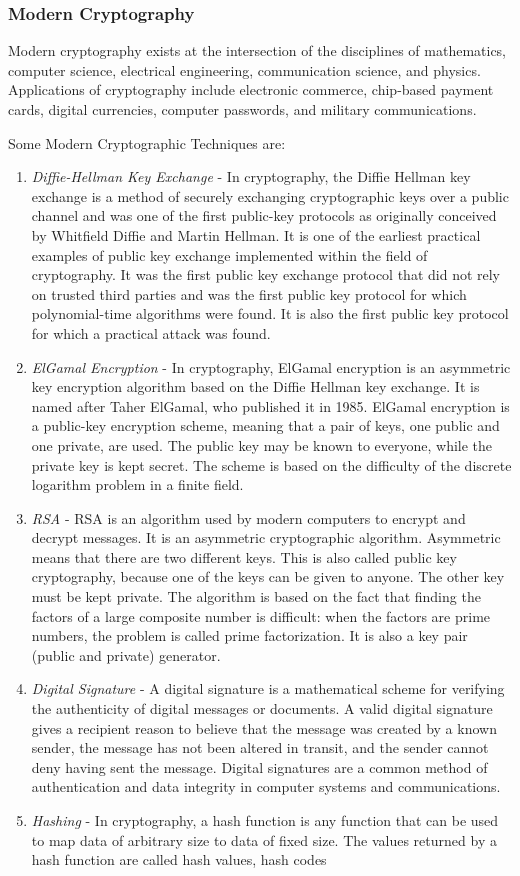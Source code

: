 \documentclass[11pt]{article}
\begin{document}
\subsubsection{Modern Cryptography}

Modern cryptography exists at the intersection of the disciplines of mathematics, computer science, electrical engineering, communication science, and physics. Applications of cryptography include electronic commerce, chip-based payment cards, digital currencies, computer passwords, and military communications.

Some Modern Cryptographic Techniques are:

\begin{enumerate}
	\item \textit{Diffie-Hellman Key Exchange} - In cryptography, the Diffie Hellman key exchange is a method of securely exchanging cryptographic keys over a public channel and was one of the first public-key protocols as originally conceived by Whitfield Diffie and Martin Hellman. It is one of the earliest practical examples of public key exchange implemented within the field of cryptography. It was the first public key exchange protocol that did not rely on trusted third parties and was the first public key protocol for which polynomial-time algorithms were found. It is also the first public key protocol for which a practical attack was found.
	\item \textit{ElGamal Encryption} - In cryptography, ElGamal encryption is an asymmetric key encryption algorithm based on the Diffie Hellman key exchange. It is named after Taher ElGamal, who published it in 1985. ElGamal encryption is a public-key encryption scheme, meaning that a pair of keys, one public and one private, are used. The public key may be known to everyone, while the private key is kept secret. The scheme is based on the difficulty of the discrete logarithm problem in a finite field.
	\item \textit{RSA} - RSA is an algorithm used by modern computers to encrypt and decrypt messages. It is an asymmetric cryptographic algorithm. Asymmetric means that there are two different keys. This is also called public key cryptography, because one of the keys can be given to anyone. The other key must be kept private. The algorithm is based on the fact that finding the factors of a large composite number is difficult: when the factors are prime numbers, the problem is called prime factorization. It is also a key pair (public and private) generator.
	\item \textit{Digital Signature} - A digital signature is a mathematical scheme for verifying the authenticity of digital messages or documents. A valid digital signature gives a recipient reason to believe that the message was created by a known sender, the message has not been altered in transit, and the sender cannot deny having sent the message. Digital signatures are a common method of authentication and data integrity in computer systems and communications.
	\item \textit{Hashing} - In cryptography, a hash function is any function that can be used to map data of arbitrary size to data of fixed size. The values returned by a hash function are called hash values, hash codes


\end{enumerate}
\end{document}
